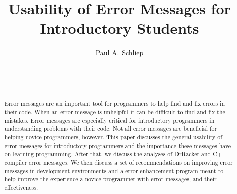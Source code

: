 \documentclass{sig-alternate}
\begin{document}

\title{Usability of Error Messages for Introductory Students}


\author{
\alignauthor
Paul A. Schliep\\
	\\
	\\
	\\
}

\maketitle
\begin{abstract}
Error messages are an important tool for programmers to help find and fix errors in their code.
When an error message is unhelpful it can be difficult to find and fix the mistakes.
Error messages are especially critical for introductory programmers in understanding problems with their code.
Not all error messages are beneficial for helping novice programmers, however.
This paper discusses the general usability of error messages for introductory programmers and the importance these messages have on learning programming.
After that, we discuss the analyses of DrRacket and C++ compiler error messages.
We then discuss a set of recommendations on improving error messages in development environments and a error enhancement program meant to help improve the experience a novice programmer with error messages, and their effectiveness.

\end{abstract}

\end{document}
